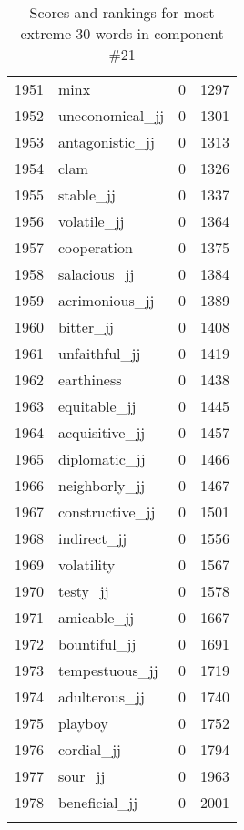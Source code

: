 \begin{longtable}[!htbp]{| rlr@{.}l |}
    1951 & minx & 0 & 1297 \\
    1952 & uneconomical\_jj & 0 & 1301 \\
    1953 & antagonistic\_jj & 0 & 1313 \\
    1954 & clam & 0 & 1326 \\
    1955 & stable\_jj & 0 & 1337 \\
    1956 & volatile\_jj & 0 & 1364 \\
    1957 & cooperation & 0 & 1375 \\
    1958 & salacious\_jj & 0 & 1384 \\
    1959 & acrimonious\_jj & 0 & 1389 \\
    1960 & bitter\_jj & 0 & 1408 \\
    1961 & unfaithful\_jj & 0 & 1419 \\
    1962 & earthiness & 0 & 1438 \\
    1963 & equitable\_jj & 0 & 1445 \\
    1964 & acquisitive\_jj & 0 & 1457 \\
    1965 & diplomatic\_jj & 0 & 1466 \\
    1966 & neighborly\_jj & 0 & 1467 \\
    1967 & constructive\_jj & 0 & 1501 \\
    1968 & indirect\_jj & 0 & 1556 \\
    1969 & volatility & 0 & 1567 \\
    1970 & testy\_jj & 0 & 1578 \\
    1971 & amicable\_jj & 0 & 1667 \\
    1972 & bountiful\_jj & 0 & 1691 \\
    1973 & tempestuous\_jj & 0 & 1719 \\
    1974 & adulterous\_jj & 0 & 1740 \\
    1975 & playboy & 0 & 1752 \\
    1976 & cordial\_jj & 0 & 1794 \\
    1977 & sour\_jj & 0 & 1963 \\
    1978 & beneficial\_jj & 0 & 2001 \\
    \hline
    \caption{Scores and rankings for most extreme 30 words in component \#21} \\
\end{longtable}
